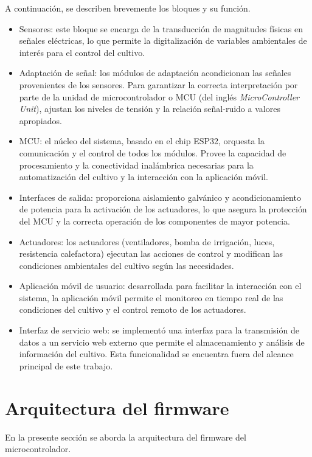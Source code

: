 A continuación, se describen brevemente los bloques y su función.

\begin{itemize}
	\item Sensores: este bloque se encarga de la transducción de magnitudes físicas en señales eléctricas, lo que permite la digitalización de variables ambientales de interés para el control del cultivo.
	\item Adaptación de señal: los módulos de adaptación acondicionan las señales provenientes de los sensores. Para garantizar la correcta interpretación por parte de la unidad de microcontrolador o MCU (del inglés \textit{MicroController Unit}), ajustan los niveles de tensión y la relación señal-ruido a valores apropiados.
	\item MCU: el núcleo del sistema, basado en el chip ESP32, orquesta la comunicación y el control de todos los módulos. Provee la capacidad de procesamiento y la conectividad inalámbrica necesarias para la automatización del cultivo y la interacción con la aplicación móvil.
	\item Interfaces de salida: proporciona aislamiento galvánico y acondicionamiento de potencia para la activación de los actuadores, lo que asegura la protección del MCU y la correcta operación de los componentes de mayor potencia.
	\item Actuadores: los actuadores (ventiladores, bomba de irrigación, luces, resistencia calefactora) ejecutan las acciones de control y modifican las condiciones ambientales del cultivo según las necesidades.
	\item Aplicación móvil de usuario: desarrollada para facilitar la interacción con el sistema, la aplicación móvil permite el monitoreo en tiempo real de las condiciones del cultivo y el control remoto de los actuadores.
	\item Interfaz de servicio web: se implementó una interfaz para la transmisión de datos a un servicio web externo que permite el almacenamiento y análisis de información del cultivo. Esta funcionalidad se encuentra fuera del alcance principal de este trabajo.

\end{itemize}

\section{Arquitectura del firmware}

En la presente sección se aborda la arquitectura del firmware del microcontrolador.

